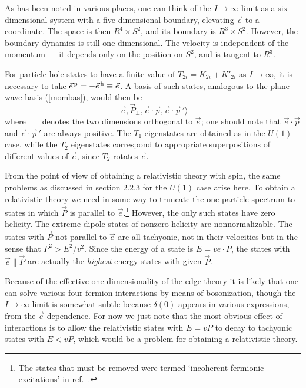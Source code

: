 \documentclass[a4paper,12pt]{article}
\newcommand{\R}{R}
\begin{document}
As has been noted in various places, one can think of the $I \to \infty$ limit
as a six-dimensional system with a five-dimensional boundary, elevating $\vec
e$ to a coordinate.  The space is then
$\R^4 \times S^2$, and its boundary is $\R^3 \times S^2$.  However, the
boundary dynamics is still one-dimensional.  The velocity is independent of the
momentum --- it depends only on the position on $S^2$, and is tangent to
$\R^3$.  

For particle-hole states to have a finite value of $T_{2i}
= K_{2i} + K'_{2i}$ as $I \to \infty$, it is necessary to take $\vec e^{\,\rm
p} = - \vec e^{\,\rm h} \equiv \vec e$.  A basis of such states, analogous to
the plane wave basis (\ref{mombas}), would then be
\begin{equation}
| \vec e, \vec P_\perp, \vec e \cdot \vec p,  \vec e \cdot \vec p\,' \rangle
\end{equation}
where $\perp$ denotes the two dimensions orthogonal to $\vec e$; one should
note that $\vec e \cdot \vec p$ and $\vec e \cdot \vec p\,'$ are always
positive.  The
$T_1$ eigenstates are obtained as in the $U(1)$ case, while the $T_2$
eigenstates correspond to appropriate superpositions of different values of
$\vec e$, since
$T_2$ rotates $\vec e$.

From the point of view of obtaining a relativistic theory with spin, the same
problems as discussed in section 2.2.3 for the $U(1)$ case arise here. 
To obtain a relativistic theory we need in some way to truncate the
one-particle spectrum to states in which
$\vec P$ is parallel to $\vec e$.\footnote{The states that must be removed 
were termed `incoherent fermionic excitations' in
ref.~\cite{hz1}.}  
However, the only such states have
zero helicity.  The extreme dipole states of nonzero helicity are
nonnormalizable.  The states with  $\vec P$ not parallel to $\vec e$ are all
tachyonic, not in their velocities but in the sense that
$P^2 > E^2/v^2$.  Since the energy of a state is $E = ve \cdot P$, the states
with $\vec e  \parallel \vec P$ are actually the {\it highest} energy states
with given
$\vec P$.

Because of the effective one-dimensionality of the edge theory it is likely
that one can solve various four-fermion interactions by means of bosonization, 
though the $I \to \infty$ limit is somewhat subtle because $\delta(0)$ appears
in various expressions, from the $\vec e$ dependence.  
For now we just note
that the most obvious effect of interactions is to allow the relativistic
states with $E = vP$ to decay to tachyonic states with $E < vP$, which would
be a problem for obtaining a relativistic theory.
\end{document}
